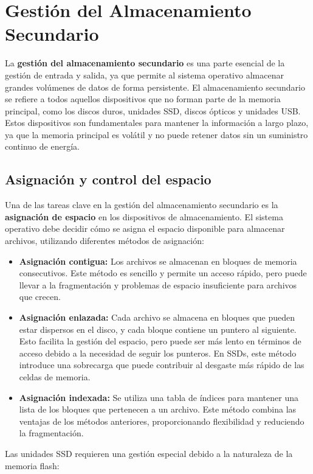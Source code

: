 \newpage

\section{Gestión del Almacenamiento Secundario}

La \textbf{gestión del almacenamiento secundario} es una parte esencial de la gestión de entrada y salida, ya que permite al sistema operativo almacenar grandes volúmenes de datos de forma persistente. El almacenamiento secundario se refiere a todos aquellos dispositivos que no forman parte de la memoria principal, como los discos duros, unidades SSD, discos ópticos y unidades USB. Estos dispositivos son fundamentales para mantener la información a largo plazo, ya que la memoria principal es volátil y no puede retener datos sin un suministro continuo de energía.

\subsection{Asignación y control del espacio}

Una de las tareas clave en la gestión del almacenamiento secundario es la \textbf{asignación de espacio} en los dispositivos de almacenamiento. El sistema operativo debe decidir cómo se asigna el espacio disponible para almacenar archivos, utilizando diferentes métodos de asignación:

\begin{itemize}
	\item \textbf{Asignación contigua:} Los archivos se almacenan en bloques de memoria consecutivos. Este método es sencillo y permite un acceso rápido, pero puede llevar a la fragmentación y problemas de espacio insuficiente para archivos que crecen. 
	\item \textbf{Asignación enlazada:} Cada archivo se almacena en bloques que pueden estar dispersos en el disco, y cada bloque contiene un puntero al siguiente. Esto facilita la gestión del espacio, pero puede ser más lento en términos de acceso debido a la necesidad de seguir los punteros. En SSDs, este método introduce una sobrecarga que puede contribuir al desgaste más rápido de las celdas de memoria.
	\item \textbf{Asignación indexada:} Se utiliza una tabla de índices para mantener una lista de los bloques que pertenecen a un archivo. Este método combina las ventajas de los métodos anteriores, proporcionando flexibilidad y reduciendo la fragmentación. 
\end{itemize}
Las unidades SSD requieren una gestión especial debido a la naturaleza de la memoria flash:

